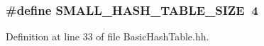 \subsubsection[{S\+M\+A\+L\+L\+\_\+\+H\+A\+S\+H\+\_\+\+T\+A\+B\+L\+E\+\_\+\+S\+I\+Z\+E}]{\setlength{\rightskip}{0pt plus 5cm}\#define S\+M\+A\+L\+L\+\_\+\+H\+A\+S\+H\+\_\+\+T\+A\+B\+L\+E\+\_\+\+S\+I\+Z\+E~4}\label{BasicHashTable_8hh_aada05a2d5d047eb8bd960c127381c1d1}


Definition at line 33 of file Basic\+Hash\+Table.\+hh.

